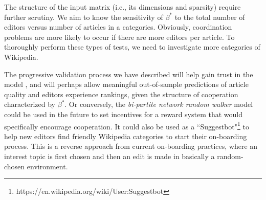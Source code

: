 The structure of the input matrix (i.e., its dimensions and sparsity) require further scrutiny. We aim to know the sensitivity of $\beta^{*}$ to the total number of editors versus number of articles in a categories. Obviously, coordination problems are more likely to occur if there are more editors per article. To thoroughly perform these types of tests, we need to investigate more categories of Wikipedia.

The progressive validation process we have described will help gain trust in the model \cite{sornette2007}, and will perhaps allow meaningful out-of-sample predictions of article quality and editors experience rankings, given the structure of cooperation characterized by $\beta^{*}$. Or conversely, the {\it bi-partite network random walker} model could be used in the future to set incentives for a reward system that would specifically encourage cooperation. It could also be used as a ``Suggestbot"\footnote{https://en.wikipedia.org/wiki/User:Suggestbot} to help new editors find friendly Wikipedia categories to start their on-boarding process. This is a reverse approach from current on-boarding practices, where an interest topic is first chosen and then an edit is made in basically a random-chosen environment.



